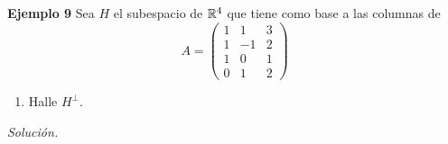 \subsection{}

\begin{frame}%
	
	\begin{ej}{\textbf{Ejemplo 9}}\justifying 
		Sea $H$ el subespacio de $\mathbb{R}^4$ que tiene como base a las columnas de  
		\[
		A = 
		\left(
		\begin{array}{rrr}
		1 & 1 & 3 \\[1mm]
		1 & -1 & 2 \\[1mm]
		1 & 0 & 1 \\[1mm]
		0 & 1 & 2 
		\end{array}
		\right)
		\]
		\begin{enumerate}
			\item[\labelname{$c$}] Halle $H^{\perp}$.
		\end{enumerate}
	\end{ej}
	\textit{Solución.}
	
\end{frame}
